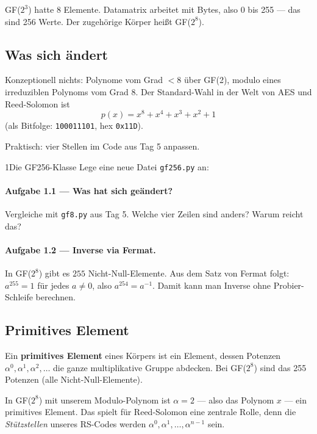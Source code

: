 GF($2^3$) hatte 8 Elemente. Datamatrix arbeitet mit Bytes, also
0 bis 255 — das sind 256 Werte. Der zugehörige Körper heißt
GF($2^8$).

\subsection*{Was sich ändert}

Konzeptionell nichts: Polynome vom Grad $< 8$ über GF(2), modulo
eines irreduziblen Polynoms vom Grad 8. Der Standard-Wahl in der
Welt von AES und Reed-Solomon ist
\[
  p(x) = x^8 + x^4 + x^3 + x^2 + 1
\]
(als Bitfolge: \texttt{100011101}, hex \texttt{0x11D}).

Praktisch: vier Stellen im Code aus Tag 5 anpassen.

\begin{pythoneinheit}{1}{Die GF256-Klasse}
Lege eine neue Datei \texttt{gf256.py} an:


\paragraph{Aufgabe 1.1 — Was hat sich geändert?}
Vergleiche mit \texttt{gf8.py} aus Tag 5. Welche vier Zeilen sind
anders? Warum reicht das?

\paragraph{Aufgabe 1.2 — Inverse via Fermat.}
In GF($2^8$) gibt es $255$ Nicht-Null-Elemente. Aus dem Satz von
Fermat folgt: $a^{255} = 1$ für jedes $a \ne 0$, also
$a^{254} = a^{-1}$. Damit kann man Inverse ohne Probier-Schleife
berechnen.

\end{pythoneinheit}

\subsection*{Primitives Element}

Ein \textbf{primitives Element} eines Körpers ist ein Element, dessen
Potenzen $\alpha^0, \alpha^1, \alpha^2, \dots$ die ganze
multiplikative Gruppe abdecken. Bei GF($2^8$) sind das 255 Potenzen
(alle Nicht-Null-Elemente).

In GF($2^8$) mit unserem Modulo-Polynom ist $\alpha = 2$ — also
das Polynom $x$ — ein primitives Element. Das spielt für
Reed-Solomon eine zentrale Rolle, denn die \emph{Stützstellen} unseres
RS-Codes werden $\alpha^0, \alpha^1, \dots, \alpha^{n-1}$ sein.

